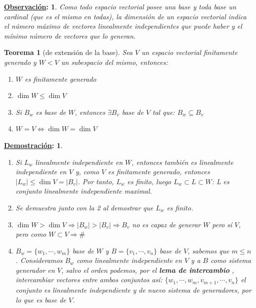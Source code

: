 \documentclass[10pt,a4paper,openright]{book}
\theoremstyle{break}
\newtheorem*{theo}{Teorema}
\newtheorem*{demo}{\underline{Demostración}:}
\newtheorem*{obs}{\underline{Observación}:}
\begin{document}
\begin{obs}
Como todo espacio vectorial posee una base y toda base un cardinal (que es el mismo en todas), la dimensión de un espacio vectorial indica el número máximo de vectores linealmente independientes que puede haber y el mínimo número de vectores que lo generan.
\end{obs}

\begin{theo}[de extensión de la base]
Sea $V$ un espacio vectorial finitamente generado y $W<V$ un subespacio del mismo, entonces:
\begin{enumerate}
\item $W$ es finitamente generado
\item $\dim W\leq \dim V$
\item Si $B_w$ es base de $W$, entonces $\exists B_v$ base de $V$ tal que: $B_w\subseteq B_v$
\item $W=V\Leftrightarrow \dim W=\dim V$
\end{enumerate}
\end{theo}
\begin{demo}
\begin{enumerate}
\item Si $L_w$ linealmente independiente en $W$, entonces también es linealmente independiente en $V$ y, como $V$ es finitamente generado, entonces $|L_w|\leq \dim V=|B_v|$. Por tanto, $L_w$ es finito, luego $L_w\subset L\subset W$: L es conjunto linealmente independiente maximal.

\item Se demuestra junto con la 2 al demostrar que $L_w$ es finito.

\item $\dim W>\dim V\Rightarrow |B_w|>|B_v|\Rightarrow B_v$ no es capaz de generar $W$ pero sí $V$, pero como $W\subset V\Rightarrow \#$

\item $B_w=\{w_1,\cdots, w_m\}$ base de $W$ y $B=\{v_1,\cdots, v_n\}$ base de $V$, sabemos que $m\leq n$. Consideramos $B_w$ como linealmente independiente en $V$ y a $B$ como sistema generador en $V$, salvo el orden podemos, por el \textbf{lema de intercambio} , intercambiar vectores entre ambos conjuntos así: $\{w_1, \cdots , w_m, v_{m+1}, \cdots , v_n \}$ el conjunto es linealmente independiente y de nuevo sistema de generadores, por lo que es base de $V$.
\end{enumerate}
\end{demo}
\end{document}
